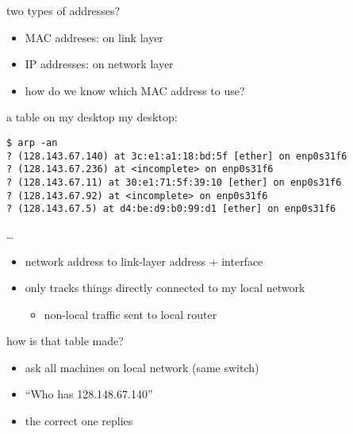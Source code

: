 \begin{frame}{two types of addresses?}
    \begin{itemize}
    \item MAC addreses: on link layer
    \item IP addresses: on network layer
    \vspace{.5cm}
    \item how do we know which MAC address to use?
    \end{itemize}
\end{frame}

\begin{frame}[fragile]{a table on my desktop}
my desktop: \\
\begin{Verbatim}[fontsize=\fontsize{11}{12}\selectfont]
$ arp -an
? (128.143.67.140) at 3c:e1:a1:18:bd:5f [ether] on enp0s31f6
? (128.143.67.236) at <incomplete> on enp0s31f6
? (128.143.67.11) at 30:e1:71:5f:39:10 [ether] on enp0s31f6
? (128.143.67.92) at <incomplete> on enp0s31f6
? (128.143.67.5) at d4:be:d9:b0:99:d1 [ether] on enp0s31f6
\end{Verbatim}
\ldots
\begin{itemize}
    \item network address to link-layer address + interface
    \item only tracks things directly connected to my local network
        \begin{itemize}
        \item non-local traffic sent to local router
        \end{itemize}
\end{itemize}
\end{frame}

\begin{frame}{how is that table made?}
    \begin{itemize}
    \item ask all machines on local network (same switch)
    \item ``Who has 128.148.67.140''
    \item the correct one replies
    \end{itemize}
\end{frame}

